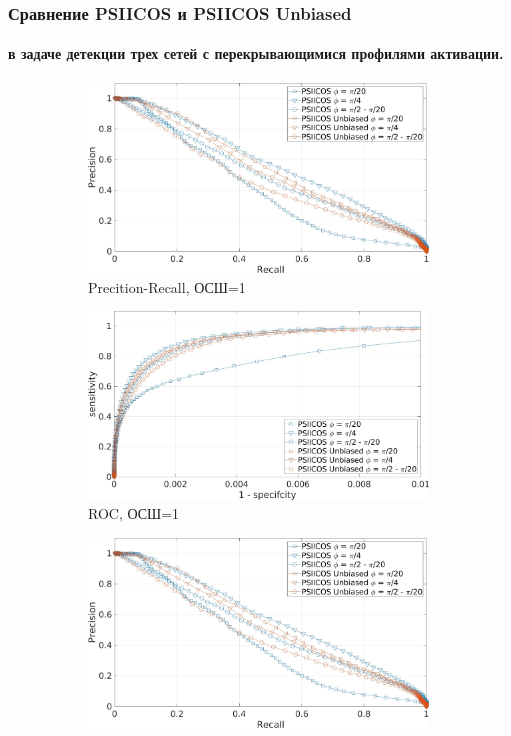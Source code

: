 \documentclass[12pt]{beamer}
\begin{document}
\begin{frame}[t]
    \frametitle{Сравнение PSIICOS и PSIICOS Unbiased}
    \framesubtitle{в задаче детекции трех сетей с перекрывающимися профилями активации.}
    \vspace{-0.3cm}
    \begin{figure}[htbp]
        \begin{subfigure}[t]{0.49\textwidth}
            \includegraphics[width=0.99\textwidth]{../images/pre_rec_3_ntw_snr_1.jpg}
            \caption{\tiny Precition-Recall, ОСШ=1}\label{fig:psiicos_vs_unbiased_3_ntw_a}
        \end{subfigure}
        \begin{subfigure}[t]{0.49\textwidth}
            \includegraphics[width=0.99\textwidth]{../images/roc_3_ntw_snr_1.jpg}
            \caption{\tiny ROC, ОСШ=1}\label{fig:psiicos_vs_unbiased_3_ntw_b}
        \end{subfigure}
        \begin{subfigure}[t]{0.49\textwidth}
            \includegraphics[width=0.99\textwidth]{../images/pre_rec_3_ntw_snr_1.jpg}

\end{subfigure}
\end{figure}
\end{frame}
\end{document}
